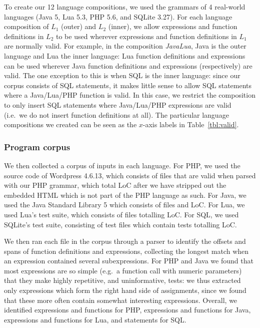 \documentclass[sigplan,screen]{acmart}\settopmatter{printfolios=true,printccs=false,printacmref=false}
\begin{document}
To create our 12 language compositions, we used the grammars of 4 real-world
languages (Java 5, Lua 5.3, PHP 5.6, and SQLite 3.27).
For each language composition of $L_1$ (outer) and $L_2$ (inner), we allow
expressions and function definitions in $L_2$ to be used wherever expressions
and function definitions in $L_1$ are normally valid. For example, in the
composition \emph{JavaLua}, Java is the outer language and Lua the inner
language: Lua function definitions and expressions can be used wherever Java
function definitions and expressions (respectively) are valid. The one exception
to this is when SQL is the inner language: since our corpus consists of SQL
statements, it makes little sense to allow SQL statements where a Java/Lua/PHP
function is valid. In this case, we restrict the composition to only insert SQL
statements where Java/Lua/PHP expressions are valid (i.e.~we do not insert
function definitions at all). The
particular language compositions we created can be seen as the $x$-axis labels
in Table~\ref{tbl:valid}.


\subsubsection{Program corpus}

We then collected a corpus of inputs in each language.
For PHP, we used the source code of Wordpress 4.6.13, which consists of \corpusphpfiles files that are
valid when parsed with our PHP grammar, which total \corpusphploc LoC after we
have stripped out the embedded HTML which is not part of the PHP
language as such. For Java, we used the Java Standard Library 5 which consists
of \corpusjavafiles files and \corpusjavaloc LoC.
For Lua, we used Lua's test suite, which consists of \corpusluafiles files totalling \corpuslualoc LoC.
For SQL, we used SQLite's test suite, consisting of \corpussqlfiles test files which
contain \corpussqltests tests totalling \corpussqlloc LoC.

We then ran each file in the corpus through a parser to identify the offsets and spans
of function definitions and expressions, collecting the longest match when an
expression contained several subexpressions. For PHP and Java 
we found that most expressions are so simple (e.g.~a function call with numeric
parameters) that they make highly repetitive, and uninformative, tests: we thus
extracted only expressions which form the right hand side of assignments, since
we found that these more often contain somewhat interesting expressions.
Overall, we identified \corpusphpexprs
expressions and \corpusphpfuncs functions for PHP, \corpusjavaexprs expressions and \corpusjavafuncs functions for
Java, \corpusluaexprs expressions and \corpusluafuncs functions for Lua, and \corpussqlstmts statements for SQL.
\end{document}
